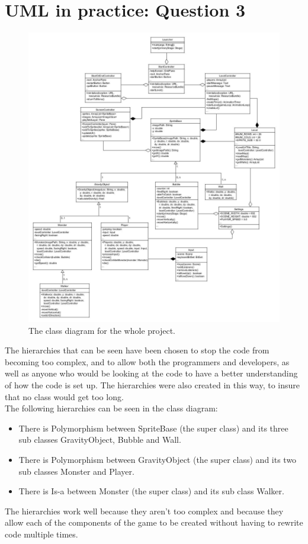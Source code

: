 \chapter{UML in practice: Question 3}

\begin{figure}[h]
\includegraphics[width=\textwidth]{classDiagramsUML_3.jpg}
\caption{The class diagram for the whole project.}
\end{figure}

\noindent The hierarchies that can be seen have been chosen to stop the code from becoming too complex, and to allow both the programmers and developers, as well as anyone who would be looking at the code to have a better understanding of how the code is set up. The hierarchies were also created in this way, to insure that no class would get too long.
\\
\noindent The following hierarchies can be seen in the class diagram:
\begin{itemize}
\itemsep0em 
\item There is Polymorphism between SpriteBase (the super class) and its three sub classes GravityObject, Bubble and Wall.
\item There is Polymorphism between GravityObject (the super class) and its two sub classes Monster and Player.
\item There is Is-a between Monster (the super class) and its sub class Walker.\\
\end{itemize} 

\noindent The hierarchies work well because they aren't too complex and because they allow each of the components of the game to be created without having to rewrite code multiple times.     